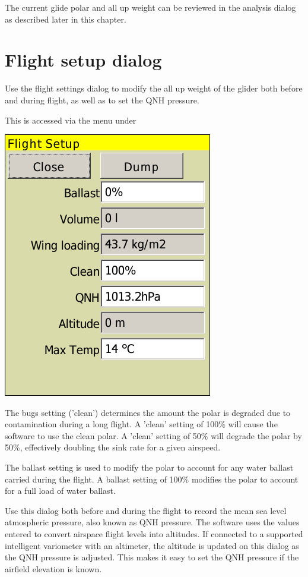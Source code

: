 \documentclass[a4paper,12pt]{refrep}
\begin{document}

The current glide polar and all up weight can be reviewed in the
analysis dialog as described later in this chapter.

\section{Flight setup dialog}\label{sec:basic-sett-dial}
Use the flight settings dialog to modify the all up weight of the glider both
before and during flight, as well as to set the QNH pressure.  

This is accessed via the menu under 
\begin{quote}
\blink{}
\end{quote}

\begin{center}
\includegraphics[angle=0,width=0.45\linewidth,keepaspectratio='true']{figures/dialog-basicsettings.png}
\end{center}

The bugs setting ('clean') determines the amount the polar is degraded
due to contamination during a long flight.  A 'clean' setting of 100\%
will cause the software to use the clean polar. A 'clean' setting of
50\% will degrade the polar by 50\%, effectively doubling the sink
rate for a given airspeed.

The ballast setting is used to modify the polar to account for any
water ballast carried during the flight. A ballast setting of 100\%
modifies the polar to account for a full load of water ballast.  

Use this dialog both before and during the flight to record the mean
sea level atmospheric pressure, also known as QNH pressure.  The
software uses the values entered to convert airspace flight levels
into altitudes.  If connected to a supported intelligent variometer
with an altimeter, the altitude is updated on this dialog as the QNH
pressure is adjusted.  This makes it easy to set the QNH pressure if
the airfield elevation is known.
\end{document}
